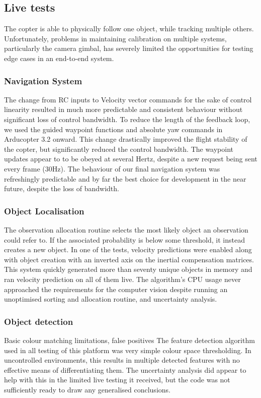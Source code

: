 \documentclass[a4paper, 11pt, titlepage]{article}
\begin{document}
  \subsection{Live tests}
    The copter is able to physically follow one object, while tracking multiple others.  Unfortunately, problems in maintaining calibration on multiple systems, particularly the camera gimbal, has severely limited the opportunities for testing edge cases in an end-to-end system.

    \subsubsection{Navigation System}
      The change from RC inputs to Velocity vector commands for the sake of control linearity resulted in much more predictable and consistent behaviour without significant loss of control bandwidth.
      To reduce the length of the feedback loop, we used the guided waypoint functions and absolute yaw commands in Arducopter 3.2 onward.  This change drastically improved the flight stability of the copter, but significantly reduced the control bandwidth.  The waypoint updates appear to to be obeyed at several Hertz, despite a new request being sent every frame (30Hz).
      The behaviour of our final navigation system was refreshingly predictable and by far the best choice for development in the near future, despite the loss of bandwidth.
    
    \subsubsection{Object Localisation}
      The observation allocation routine selects the most likely object an observation could refer to. If the associated probability is below some threshold, it instead creates a new object.
      In one of the tests, velocity predictions were enabled along with object creation with an inverted axis on the inertial compensation matrices. This system quickly generated more than seventy unique objects in memory and ran velocity prediction on all of them live. The algorithm's CPU usage never approached the requirements for the computer vision despite running an unoptimised sorting and allocation routine, and uncertainty analysis.


    \subsubsection{Object detection}
      Basic colour matching limitations, false positives
      The feature detection algorithm used in all testing of this platform was very simple colour space thresholding.  In uncontrolled environments, this results in multiple detected features with no effective means of differentiating them.  The uncertainty analysis did appear to help with this in the limited live testing it received, but the code was not sufficiently ready to draw any generalised conclusions.
\end{document}
